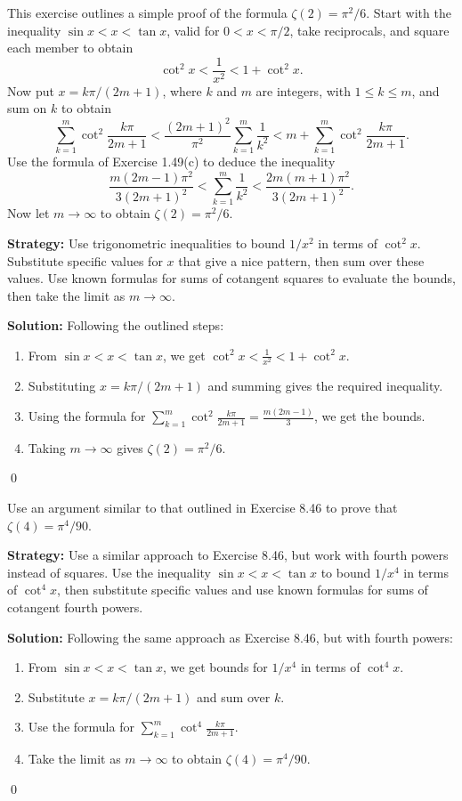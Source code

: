 \begin{problembox}
This exercise outlines a simple proof of the formula \(\zeta(2) = \pi^2/6\). Start with the inequality \(\sin x < x < \tan x\), valid for \(0 < x < \pi/2\), take reciprocals, and square each member to obtain
\[\cot^2 x < \frac{1}{x^2} < 1 + \cot^2 x.\]
Now put \(x = k\pi/(2m + 1)\), where \(k\) and \(m\) are integers, with \(1 \leq k \leq m\), and sum on \(k\) to obtain
\[\sum_{k=1}^{m} \cot^2 \frac{k\pi}{2m + 1} < \frac{(2m + 1)^2}{\pi^2} \sum_{k=1}^{m} \frac{1}{k^2} < m + \sum_{k=1}^{m} \cot^2 \frac{k\pi}{2m + 1}.\]
Use the formula of Exercise 1.49(c) to deduce the inequality
\[\frac{m(2m - 1)\pi^2}{3(2m + 1)^2} < \sum_{k=1}^m \frac{1}{k^2} < \frac{2m(m + 1)\pi^2}{3(2m + 1)^2}.\]
Now let \(m \to \infty\) to obtain \(\zeta(2) = \pi^2/6\).
\end{problembox}

\noindent\textbf{Strategy:} Use trigonometric inequalities to bound \(1/x^2\) in terms of \(\cot^2 x\). Substitute specific values for \(x\) that give a nice pattern, then sum over these values. Use known formulas for sums of cotangent squares to evaluate the bounds, then take the limit as \(m \to \infty\).

\bigskip\noindent\textbf{Solution:}
Following the outlined steps:
\begin{enumerate}
\item From \(\sin x < x < \tan x\), we get \(\cot^2 x < \frac{1}{x^2} < 1 + \cot^2 x\).
\item Substituting \(x = k\pi/(2m + 1)\) and summing gives the required inequality.
\item Using the formula for \(\sum_{k=1}^m \cot^2 \frac{k\pi}{2m + 1} = \frac{m(2m-1)}{3}\), we get the bounds.
\item Taking \(m \to \infty\) gives \(\zeta(2) = \pi^2/6\).
\end{enumerate}\qed




\begin{problembox}
Use an argument similar to that outlined in Exercise 8.46 to prove that \(\zeta(4) = \pi^4/90\).
\end{problembox}

\noindent\textbf{Strategy:} Use a similar approach to Exercise 8.46, but work with fourth powers instead of squares. Use the inequality \(\sin x < x < \tan x\) to bound \(1/x^4\) in terms of \(\cot^4 x\), then substitute specific values and use known formulas for sums of cotangent fourth powers.

\bigskip\noindent\textbf{Solution:}
Following the same approach as Exercise 8.46, but with fourth powers:
\begin{enumerate}
\item From \(\sin x < x < \tan x\), we get bounds for \(1/x^4\) in terms of \(\cot^4 x\).
\item Substitute \(x = k\pi/(2m + 1)\) and sum over \(k\).
\item Use the formula for \(\sum_{k=1}^m \cot^4 \frac{k\pi}{2m + 1}\).
\item Take the limit as \(m \to \infty\) to obtain \(\zeta(4) = \pi^4/90\).
\end{enumerate}
\qed